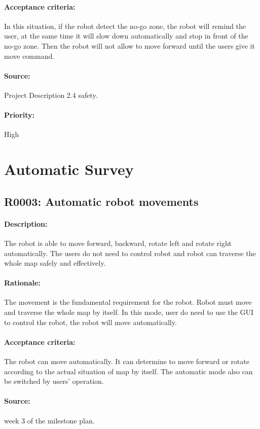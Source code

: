 \documentclass[11pt, a4paper]{report}
\begin{document}
\paragraph{Acceptance criteria:}
 In this situation, if the robot detect the no-go zone, the robot will remind the user, at the same time it will slow down automatically and stop in front of the no-go zone. Then the robot will not allow to move forward until the users give it move command.
\paragraph{Source:}
Project Description 2.4 safety.   
\paragraph{Priority:}
High


\section{Automatic Survey}
\subsection{R0003: Automatic robot movements }
\paragraph{Description:}
The robot is able to move forward, backward, rotate left and rotate right automatically. The users do not need to control robot and robot can traverse the whole map safely and effectively.
\paragraph{Rationale:}
The movement is the fundamental requirement for the robot. Robot must move and traverse the whole map by itself. In this mode, user do need to use the GUI to control the robot, the robot will move automatically.    
\paragraph{Acceptance criteria:}
The robot can move automatically. It can determine to move forward or rotate according to the actual situation of map by itself. The automatic mode also can be switched by users' operation.  
\paragraph{Source:}
 week 3 of the milestone plan. 
\end{document}
